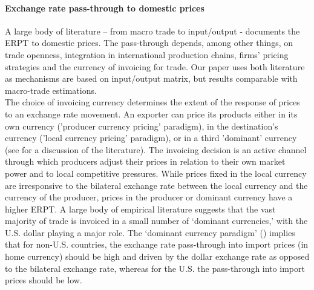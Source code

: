 \documentclass[11pt,a4paper]{paper} %
\begin{document}
\paragraph{Exchange rate pass-through to domestic prices} 
A large body of literature – from macro trade to input/output - documents the ERPT to domestic prices. 
The pass-through depends, among other things, on trade openness, integration in international production chains, firms' pricing strategies and the currency of invoicing for trade. Our paper uses both literature as mechanisms are based on input/output matrix, but results comparable with macro-trade estimations. \\
The choice of invoicing currency determines the extent of the response of prices to an exchange rate movement. 
An exporter can price its products either in its own currency ('producer currency pricing' paradigm), in the destination’s currency ('local currency pricing' paradigm), or in a third 'dominant' currency (see \cite{Ortega2020} for a discussion of the literature). 
The invoicing decision is an active channel through which producers adjust their prices in relation to their own market power and to local competitive pressures.
While prices fixed in the local currency are irresponsive to the bilateral exchange rate between the local currency and the currency of the
producer, prices in the producer or dominant currency have a higher ERPT.
A large body of empirical literature suggests that the vast majority of trade is invoiced in a small number of ‘dominant currencies,’ with the U.S. dollar playing a major role. 
The ‘dominant currency paradigm’ (\cite{Gopinath2020}) implies that for non-U.S. countries, the exchange rate pass-through into import prices (in home currency) should be high and driven by the dollar exchange rate as opposed to the bilateral exchange rate, whereas for the U.S. the pass-through into import prices should be low.\\
\end{document}
